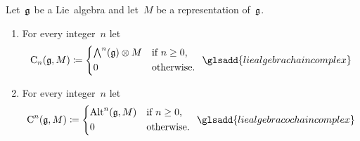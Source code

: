 \begin{definition}
	\label{construction of lie algebra homology and cohomology}
	Let~$\mathfrak{g}$ be a Lie~algebra and let~$M$ be a representation of~$\mathfrak{g}$.
	\begin{enumerate}
		\item
			For every integer~$n$ let
			\[
				\Chain_n(\glie, M)
				\defined
				\begin{cases*}
					\Exterior^n(\glie) \tensor M  & if~$n \geq 0$,  \\
					0                             & otherwise.
				\end{cases*}
				\glsadd{lie algebra chain complex}
			\]
		\item
			For every integer~$n$ let
			\[
				\Chain^n(\glie, M)
				\defined
				\begin{cases*}
					\Alt^n(\glie, M)  & if~$n \geq 0$,  \\
					0                 & otherwise.
				\end{cases*}
				\glsadd{lie algebra cochain complex}
			\]
	\end{enumerate}
\end{definition}


